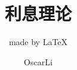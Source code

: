 \documentclass[cn,11pt,chinese,blue]{elegantbook}
\title{利息理论}
\subtitle{made by \LaTeX{} }
\author{OscarLi}
\begin{document}
\def\angles#1{{%
		\vbox{\hrule height .2pt
			\kern 1pt
			\hbox{$\scriptstyle {#1}\kern 1pt$}%
		}\kern-.05pt \vrule width .2pt
}}
%
\maketitle







\end{document}
